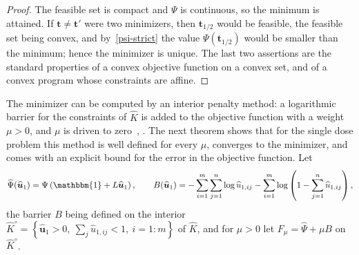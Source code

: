 \documentclass[11pt]{article}
\theoremstyle{plain}
\theoremstyle{definition}
\theoremstyle{remark}
\numberwithin{equation}{section}
\numberwithin{figure}{section}
\numberwithin{table}{section}
\begin{document}
\begin{proof}
The feasible set is compact and $\Psi$ is continuous, so the minimum is
attained. If $\bm t\neq\bm t'$ were two minimizers, then
$\bm t_{1/2}$ would be feasible, the feasible set being convex, and
by~\eqref{psi-strict} the value $\Psi\left(\bm t_{1/2}\right)$ would be smaller
than the minimum; hence the minimizer is unique. The last two assertions are the
standard properties of a
convex objective function on a convex set, and of a convex program whose constraints are
affine.
\end{proof}

The minimizer can be computed by an interior penalty method: a logarithmic
barrier for the constraints of $\widehat K$ is added to the objective function with a
weight $\mu>0$, and $\mu$ is driven to zero~\cite{1968Fiacco_McCormick},
\cite[Chapter 11]{2004Boyd_Vandenberghe}. The next theorem shows that for the
single dose problem this method is well defined for every $\mu$, converges to
the minimizer, and comes with an explicit bound for the error in the objective
function. Let
\begin{equation}\label{psi-hat}
\widehat\Psi(\widehat{\bm u}_1)=\Psi\left(\mathbbm{1}+L\widehat{\bm u}_1\right),
\qquad
B(\widehat{\bm u}_1)=-\sum_{i=1}^{m}\sum_{j=1}^{n}\log\widehat u_{1,ij}
-\sum_{i=1}^{m}\log\left(1-\sum_{j=1}^{n}\widehat u_{1,ij}\right),
\end{equation}
the barrier $B$ being defined on the interior
$\widehat K^\circ=\left\{\widehat{\bm u}_1>0,\ \sum_j\widehat u_{1,ij}<1,\ i=1:m\right\}$
of $\widehat K$, and for $\mu>0$ let $F_\mu=\widehat\Psi+\mu B$ on $\widehat K^\circ$.
\end{document}
